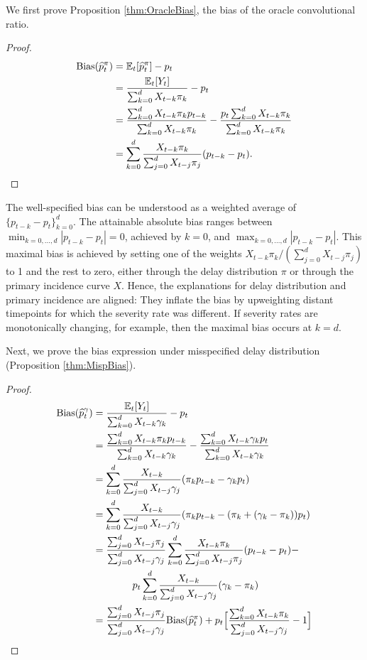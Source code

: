 \documentclass{article}
\renewcommand{\hat}{\widehat} %
\begin{document}
We first prove Proposition \ref{thm:OracleBias}, the bias of the oracle convolutional ratio. 
\begin{proof}
    \begin{align*}%
    \text{Bias}(\hat{p}_t^\pi) &= \E_t[\hat{p}_t^\pi] - p_t \\
    &= \frac{\E_t[Y_t]}{\sum_{k=0}^d X_{t-k}\pi_k} - p_t \\ 
    &= \frac{\sum_{k=0}^d X_{t-k}\pi_k p_{t-k}}{\sum_{k=0}^d X_{t-k}\pi_k} - \frac{p_t \sum_{k=0}^d X_{t-k}\pi_k}{\sum_{k=0}^d X_{t-k}\pi_k}\\
    &= \sum_{k=0}^d \frac{X_{t-k}\pi_k}{\sum_{j=0}^d X_{t-j}\pi_j} (p_{t-k}-p_t).
\end{align*}
\end{proof}
The well-specified bias can be understood as a weighted average of $\{p_{t-k}-p_t\}_{k=0}^d$. The attainable absolute bias ranges between $\min_{k=0, \dotsc, d} |p_{t-k}-p_t| = 0$, achieved by $k=0$, and $\max_{k=0, \dotsc, d} |p_{t-k}-p_t|$. This maximal bias is achieved by setting one of the weights
$X_{t-k}\pi_k/(\sum_{j=0}^d X_{t-j}\pi_j)$ to 1 and the rest to zero,
either through the delay distribution $\pi$ or through the primary incidence curve $X$. Hence, the explanations for delay distribution and primary incidence are aligned: They inflate the bias by upweighting distant timepoints for which the severity rate was different. If severity rates are monotonically changing, for example, then the maximal bias occurs at $k=d$. 

Next, we prove the bias expression under misspecified delay distribution (Proposition \ref{thm:MispBias}). 
\begin{proof}
    \begin{align*}
    \text{Bias}(\hat{p}_t^\gamma) &= \frac{\E_t[Y_t]}{\sum_{k=0}^d X_{t-k}\gamma_k} - p_t \\
    &= \frac{\sum_{k=0}^d X_{t-k}\pi_k p_{t-k}}{\sum_{k=0}^d X_{t-k}\gamma_k} - \frac{\sum_{k=0}^d X_{t-k}\gamma_k p_t}{\sum_{k=0}^d X_{t-k}\gamma_k} \\
    &= \sum_{k=0}^d \frac{X_{t-k}}{\sum_{j=0}^d X_{t-j}\gamma_j}(\pi_k p_{t-k}-\gamma_k p_t) \\
    &= \sum_{k=0}^d \frac{X_{t-k}}{\sum_{j=0}^d X_{t-j}\gamma_j}(\pi_k p_{t-k}-(\pi_k +(\gamma_k-\pi_k)) p_t) \\
     &= \frac{\sum_{j=0}^d X_{t-j}\pi_j}{\sum_{j=0}^d X_{t-j}\gamma_j}\sum_{k=0}^d \frac{X_{t-k}\pi_k}{\sum_{j=0}^d X_{t-j}\pi_j}(p_{t-k}-p_t) -\\
     &\qquad\qquad p_t\sum_{k=0}^d \frac{X_{t-k}}{\sum_{j=0}^d X_{t-j}\gamma_j}(\gamma_k -\pi_k)  \\
     &= \frac{\sum_{j=0}^d X_{t-j}\pi_j}{\sum_{j=0}^d X_{t-j}\gamma_j}\text{Bias}(\hat{p}_t^\pi) + p_t\Big[ \frac{\sum_{k=0}^d X_{t-k}\pi_k}{\sum_{j=0}^d X_{t-j}\gamma_j}-1\Big]
\end{align*}
\end{proof}
\end{document}
